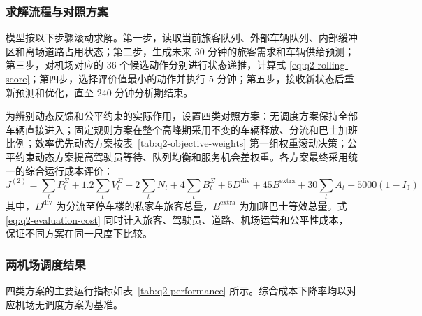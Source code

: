 \documentclass[UTF8,a4paper,11pt,onecolumn,fontset=none]{ctexart}
\begin{document}
\subsubsection{求解流程与对照方案}

模型按以下步骤滚动求解。第一步，读取当前旅客队列、外部车辆队列、内部缓冲区和离场道路占用状态；第二步，生成未来 $30$ 分钟的旅客需求和车辆供给预测；第三步，对机场对应的 $36$ 个候选动作分别进行状态递推，计算式 \eqref{eq:q2-rolling-score}；第四步，选择评价值最小的动作并执行 $5$ 分钟；第五步，接收新状态后重新预测和优化，直至 $240$ 分钟分析期结束。

为辨别动态反馈和公平约束的实际作用，设置四类对照方案：无调度方案保持全部车辆直接进入；固定规则方案在整个高峰期采用不变的车辆释放、分流和巴士加班比例；效率优先动态方案按表~\ref{tab:q2-objective-weights} 第一组权重滚动决策；公平约束动态方案提高驾驶员等待、队列均衡和服务机会差权重。各方案最终采用统一的综合运行成本评价：
\begin{equation}
  J^{(2)}
  =
  \sum_tP_t^\Sigma
  +1.2\sum_tV_t^\Sigma
  +2\sum_tN_t
  +4\sum_tB_t^\Sigma
  +5D^{\mathrm{div}}
  +45B^{\mathrm{extra}}
  +30\sum_tA_t
  +5000(1-I_{\mathrm J})
  \label{eq:q2-evaluation-cost}
\end{equation}
其中，$D^{\mathrm{div}}$ 为分流至停车楼的私家车旅客总量，$B^{\mathrm{extra}}$ 为加班巴士等效总量。式 \eqref{eq:q2-evaluation-cost} 同时计入旅客、驾驶员、道路、机场运营和公平性成本，保证不同方案在同一尺度下比较。

\subsubsection{两机场调度结果}

四类方案的主要运行指标如表~\ref{tab:q2-performance} 所示。综合成本下降率均以对应机场无调度方案为基准。
\end{document}
